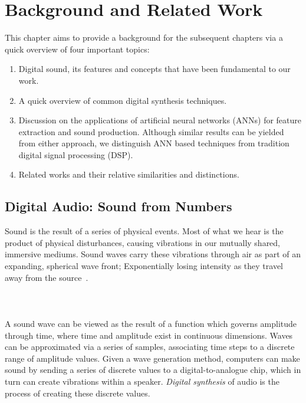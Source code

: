 \documentclass[\main/thesis.tex]{subfiles}
\begin{document}
\chapter{Background and Related Work}
\label{section:background}
This chapter aims to provide a background for the subsequent chapters via a quick overview of four important topics:\\ 
\begin{enumerate}[label=(\roman*)]
\item Digital sound, its features and concepts that have been fundamental to our work.
\item A quick overview of common digital synthesis techniques.
\item Discussion on the applications of artificial neural networks (ANNs) for feature extraction and sound production. Although similar results can be yielded from either approach, we distinguish ANN based techniques from tradition digital signal processing (DSP).
\item Related works and their relative similarities and distinctions.
\end{enumerate}
\section{Digital Audio: Sound from Numbers}
Sound is the result of a series of physical events. Most of what we hear is the product of physical disturbances, causing vibrations in our mutually shared, immersive mediums. Sound waves carry these vibrations through air as part of an expanding, spherical wave front; Exponentially losing intensity as they travel away from the source~\cite{cook1999chap4}. 
\\\\

\\\\
A sound wave can be viewed as the result of a function which governs amplitude through time, where time and amplitude exist in continuous dimensions. Waves can be approximated via a series of samples, associating time steps to a discrete range of amplitude values. 
Given a wave generation method, computers can make sound by sending a series of discrete values to a digital-to-analogue chip, which in turn can
create vibrations within a speaker.  \textit{Digital synthesis} of audio is the process of creating these discrete values. 
\\
\end{document}
